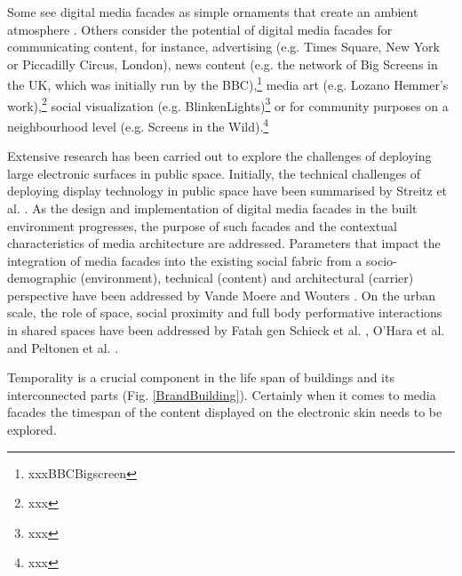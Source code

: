 Some see digital media facades as simple ornaments that create an ambient atmosphere \cite{Caspary2009}. 
Others consider the potential of digital media facades for communicating content, for instance, advertising (e.g. Times Square, New York or Piccadilly Circus, London), news content (e.g. the network of Big Screens in the UK, which was initially run by the BBC),\footnote{xxxBBCBigscreen} media art (e.g. Lozano Hemmer’s work),\footnote{xxx} social visualization (e.g. BlinkenLights)\footnote{xxx} or for community purposes on a neighbourhood level (e.g. Screens in the Wild).\footnote{xxx}

Extensive research has been carried out to explore the challenges of deploying large electronic surfaces in public space.
Initially, the technical challenges of deploying display technology in public space have been summarised by Streitz et al. \cite{Streitz2003}. 
As the design and implementation of digital media facades in the built environment progresses, the purpose of such facades and the contextual characteristics of media architecture are addressed. 
Parameters that impact the integration of media facades into the existing social fabric from a socio-demographic (environment), technical (content) and architectural (carrier) perspective have been addressed by Vande Moere and Wouters \cite{VandeMoere2012}. 
On the urban scale, the role of space, social proximity and full body performative interactions in shared spaces have been addressed by Fatah gen Schieck et al. \cite{Fatah2008}, O’Hara et al. \cite{Hara2008} and Peltonen et al. \cite{Peltonen2008}.

Temporality is a crucial component in the life span of buildings and its interconnected parts (Fig. \ref{BrandBuilding}).
Certainly when it comes to media facades the timespan of the content displayed on the electronic skin needs to be explored.



